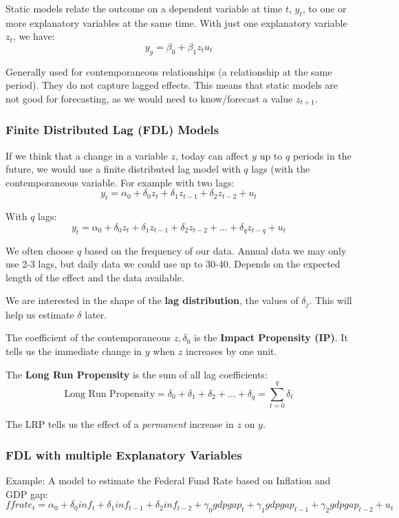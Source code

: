 \documentclass[11pt]{article}
\begin{document}
Static models relate the outcome on a dependent variable at time $t$, $y_t$, to one or more explanatory variables at the same time. With just one explanatory variable $z_t$, we have:
\[y_y = \beta_0 + \beta_1 z_t u_t\]

Generally used for contemporaneous relationships (a relationship at the same period). They do not capture lagged effects. This means that static models are not good for forecasting, as we would need to know/forecast a value $z_{t+1}$.

\subsubsection*{Finite Distributed Lag (FDL) Models}
If we think that a change in a variable $z$, today can affect $y$ up to $q$ periods in the future, we would use a finite distributed lag model with $q$ lags (with the contemporaneous variable. For example with two lags:
\[y_t = \alpha_0 + \delta_0 z_t + \delta_1 z_{t-1} + \delta_2 z_{t-2} + u_t\]

With $q$ lags:
\[ y_t = \alpha_0 + \delta_0 z_t + \delta_1 z_{t-1} + \delta_2 z_{t-2} + \ldots + \delta_q z_{t-q} + u_t\]

We often choose $q$ based on the frequency of our data. Annual data we may only use 2-3 lags, but daily data we could use up to 30-40. Depends on the expected length of the effect and the data available.

We are interested in the shape of the \textbf{lag distribution}, the values of $\delta_j$. This will help us estimate $\delta$ later.


The coefficient of the contemporaneous $z, \delta_0$ is the \textbf{Impact Propensity (IP)}. It tells us the immediate change in $y$ when $z$ increases by one unit.

The \textbf{Long Run Propensity} is the sum of all lag coefficients:
\[\text{Long Run Propensity} = \delta_0 +\delta_1 + \delta_2 + \ldots + \delta_q = \sum_{t=0}^q \delta_t\]

The LRP tells us the effect of a \textit{permanent} increase in $z$ on $y$.

\subsubsection*{FDL with multiple Explanatory Variables}

Example:
A model to estimate the Federal Fund Rate based on Inflation and GDP gap:
\[ffrate_t = \alpha_0 + \delta_0 inf_t + \delta_1 inf_{t-1} + \delta_2 inf_{t-2} + \gamma_0 gdpgap_t + \gamma_1 gdpgap_{t-1} + \gamma_2 gdpgap_{t-2} + u_t\]
\end{document}
